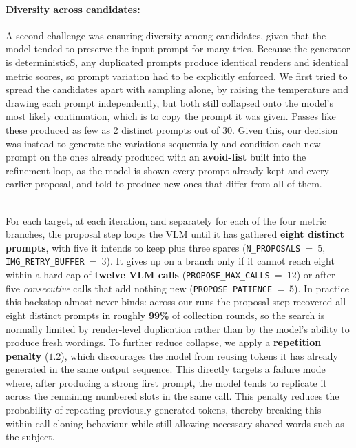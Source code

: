 \documentclass[runningheads]{llncs}
\begin{document}
\paragraph{\normalfont\textbf{Diversity across candidates:}}
\label{par:eight}
\noindent
A second challenge was ensuring diversity among candidates, given that the model tended to preserve the input prompt for many tries. Because the generator is deterministicS, any duplicated prompts produce identical renders and identical metric scores, so prompt variation had to be explicitly enforced. We first tried to spread the candidates apart with sampling alone, by raising the temperature and drawing each prompt independently, but both still collapsed onto the model's most likely continuation, which is to copy the prompt it was given. Passes like these produced as few as 2 distinct prompts out of 30. Given this, our decision was instead to generate the variations sequentially and condition each new prompt on the ones already produced with an \textbf{avoid-list} built into the refinement loop, as the model is shown every prompt already kept and every earlier proposal, and told to produce new ones that differ from all of them. 

\noindent
\\
For each target, at each iteration, and separately for each of the four metric branches, the proposal step loops the VLM until it has gathered \textbf{eight distinct prompts}, with five it intends to keep plus three spares (\texttt{N\_PROPOSALS}~=~$5$, \texttt{IMG\_RETRY\_BUFFER}~=~$3$). It gives up on a branch only if it cannot reach eight within a hard cap of \textbf{twelve VLM calls} (\texttt{PROPOSE\_MAX\_CALLS}~=~$12$) or after five \emph{consecutive} calls that add nothing new (\texttt{PROPOSE\_PATIENCE}~=~$5$). In practice this backstop almost never binds: across our runs the proposal step recovered all eight distinct prompts in roughly \textbf{99\%} of collection rounds, so the search is normally limited by render-level duplication rather than by the model's ability to produce fresh wordings. To further reduce collapse, we apply a \textbf{repetition penalty} ($1.2$), which discourages the model from reusing tokens it has already generated in the same output sequence. This directly targets a failure mode where, after producing a strong first prompt, the model tends to replicate it across the remaining numbered slots in the same call. This penalty reduces the probability of repeating previously generated tokens, thereby breaking this within-call cloning behaviour while still allowing necessary shared words such as the subject.
\end{document}
